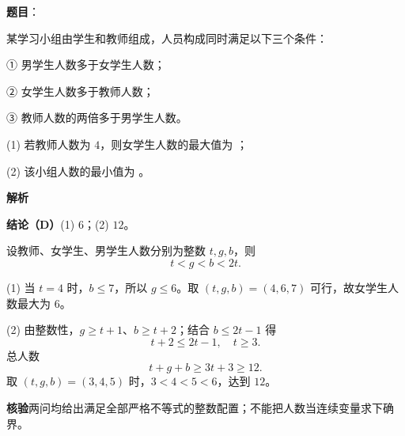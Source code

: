 \begin{answer}

\textbf{题目}：

某学习小组由学生和教师组成，人员构成同时满足以下三个条件：

① 男学生人数多于女学生人数；

② 女学生人数多于教师人数；

③ 教师人数的两倍多于男学生人数。

(1)   若教师人数为 $4$，则女学生人数的最大值为 \gkblank{}；

(2)   该小组人数的最小值为 \gkblank{}。

\textbf{解析}

\textbf{结论（D）}(1) $6$；(2) $12$。

设教师、女学生、男学生人数分别为整数 $t,g,b$，则
\nopagebreak[4]
\[
t<g<b<2t.
\]


(1) 当 $t=4$ 时，$b\leqslant7$，所以 $g\leqslant6$。取 $(t,g,b)=(4,6,7)$ 可行，故女学生人数最大为 $6$。


(2) 由整数性，$g\geqslant t+1$、$b\geqslant t+2$；结合 $b\leqslant2t-1$ 得
\nopagebreak[4]
\[
t+2\leqslant2t-1,\quad t\geqslant3.
\]
总人数
\nopagebreak[4]
\[
t+g+b\geqslant3t+3\geqslant12.
\]
取 $(t,g,b)=(3,4,5)$ 时，$3<4<5<6$，达到 $12$。

\textbf{核验}两问均给出满足全部严格不等式的整数配置；不能把人数当连续变量求下确界。



\end{answer}
